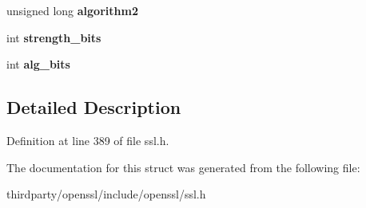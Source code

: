 \begin{DoxyCompactItemize}
\item 
\mbox{\label{structssl__cipher__st_aef80da6412c4e1fec8458c3c244d69e8}} 
unsigned long {\bfseries algorithm2}
\item 
\mbox{\label{structssl__cipher__st_ae3a40fb67452514df7770e334a99c32d}} 
int {\bfseries strength\+\_\+bits}
\item 
\mbox{\label{structssl__cipher__st_a451f084cd7c875897f5986a35a482628}} 
int {\bfseries alg\+\_\+bits}
\end{DoxyCompactItemize}


\subsection{Detailed Description}


Definition at line 389 of file ssl.\+h.



The documentation for this struct was generated from the following file\+:\begin{DoxyCompactItemize}
\item 
thirdparty/openssl/include/openssl/ssl.\+h\end{DoxyCompactItemize}
